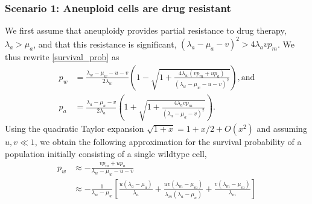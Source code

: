 \documentclass[12pt]{extarticle}
\begin{document}
\subsubsection*{Scenario 1: Aneuploid cells are drug resistant} 

We first assume that aneuploidy provides partial resistance to drug therapy, $\lambda_a>\mu_a$, and that this resistance is significant, $\left(\lambda_a-\mu_a-v\right)^2 > 4\lambda_a v p_m$.
We thus rewrite \cref{survival_prob} as
\begin{align*}
p_w&=\frac{\lambda_w-\mu_w-u-v}{2\lambda_w}\left(1-\sqrt{1+\frac{4\lambda_w\left(vp_m+up_a\right)}{\left(\lambda_w-\mu_w-u-v\right)^2}}\right) ,
\text{and} \\
p_a&=\frac{\lambda_a-\mu_a-v}{2\lambda_a}\left(1+\sqrt{1+\frac{4\lambda_avp_m}{\left(\lambda_a-\mu_a-v\right)^2}}\right) . 
\end{align*}
Using the quadratic Taylor expansion $\sqrt{1+x}=1+x/2+O(x^2)$ and assuming $u,v \ll 1$,
we obtain the following approximation for the survival probability of a population initially consisting of a single wildtype cell,
\begin{align}\label{survprobwapprox1}
p_w 
&\approx -\frac{vp_m+up_a}{\lambda_w-\mu_w-u-v}\\
\nonumber
&\approx-\frac{1}{\lambda_w-\mu_w}\left[\frac{u\left(\lambda_a-\mu_a\right)}{\lambda_a}+\frac{uv\left(\lambda_m-\mu_m\right)}{\lambda_m\left(\lambda_a-\mu_a\right)}+\frac{v\left(\lambda_m-\mu_m\right)}{\lambda_m}\right]\\
\end{align}

\end{document}
